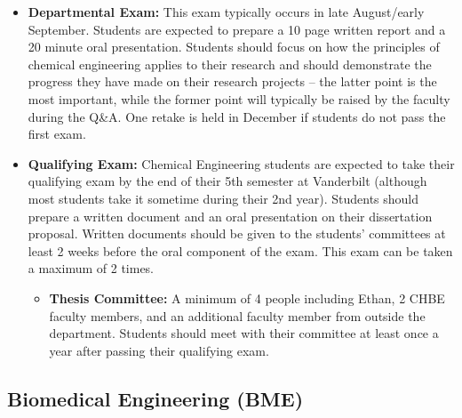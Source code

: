 \documentclass[
]{book}
\providecommand{\tightlist}{%
  \setlength{\itemsep}{0pt}\setlength{\parskip}{0pt}}
\begin{document}
\begin{itemize}
\item
  \textbf{Departmental Exam:} This exam typically occurs in late August/early September. Students are expected to prepare a 10 page written report and a 20 minute oral presentation. Students should focus on how the principles of chemical engineering applies to their research and should demonstrate the progress they have made on their research projects -- the latter point is the most important, while the former point will typically be raised by the faculty during the Q\&A. One retake is held in December if students do not pass the first exam.
\item
  \textbf{Qualifying Exam:} Chemical Engineering students are expected to take their qualifying exam by the end of their 5th semester at Vanderbilt (although most students take it sometime during their 2nd year). Students should prepare a written document and an oral presentation on their dissertation proposal. Written documents should be given to the students' committees at least 2 weeks before the oral component of the exam. This exam can be taken a maximum of 2 times.

  \begin{itemize}
  \tightlist
  \item
    \textbf{Thesis Committee:} A minimum of 4 people including Ethan, 2 CHBE faculty members, and an additional faculty member from outside the department. Students should meet with their committee at least once a year after passing their qualifying exam.
  \end{itemize}
\end{itemize}

\hypertarget{bme}{%
\subsection{Biomedical Engineering (BME)}\label{bme}}
\end{document}
